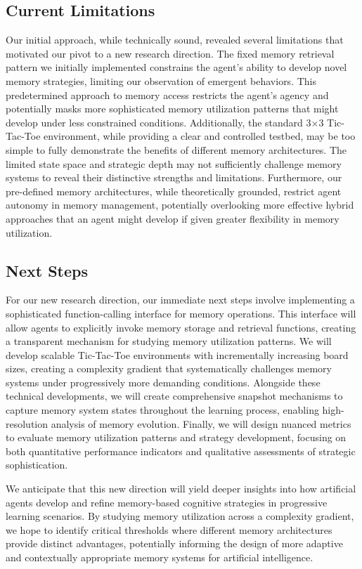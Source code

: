 \documentclass{article}
\begin{document}
\subsection{Current Limitations}

Our initial approach, while technically sound, revealed several limitations that motivated our pivot to a new research direction. The fixed memory retrieval pattern we initially implemented constrains the agent's ability to develop novel memory strategies, limiting our observation of emergent behaviors. This predetermined approach to memory access restricts the agent's agency and potentially masks more sophisticated memory utilization patterns that might develop under less constrained conditions. Additionally, the standard 3×3 Tic-Tac-Toe environment, while providing a clear and controlled testbed, may be too simple to fully demonstrate the benefits of different memory architectures. The limited state space and strategic depth may not sufficiently challenge memory systems to reveal their distinctive strengths and limitations. Furthermore, our pre-defined memory architectures, while theoretically grounded, restrict agent autonomy in memory management, potentially overlooking more effective hybrid approaches that an agent might develop if given greater flexibility in memory utilization.

\subsection{Next Steps}

For our new research direction, our immediate next steps involve implementing a sophisticated function-calling interface for memory operations. This interface will allow agents to explicitly invoke memory storage and retrieval functions, creating a transparent mechanism for studying memory utilization patterns. We will develop scalable Tic-Tac-Toe environments with incrementally increasing board sizes, creating a complexity gradient that systematically challenges memory systems under progressively more demanding conditions. Alongside these technical developments, we will create comprehensive snapshot mechanisms to capture memory system states throughout the learning process, enabling high-resolution analysis of memory evolution. Finally, we will design nuanced metrics to evaluate memory utilization patterns and strategy development, focusing on both quantitative performance indicators and qualitative assessments of strategic sophistication.

We anticipate that this new direction will yield deeper insights into how artificial agents develop and refine memory-based cognitive strategies in progressive learning scenarios. By studying memory utilization across a complexity gradient, we hope to identify critical thresholds where different memory architectures provide distinct advantages, potentially informing the design of more adaptive and contextually appropriate memory systems for artificial intelligence.
\end{document}
